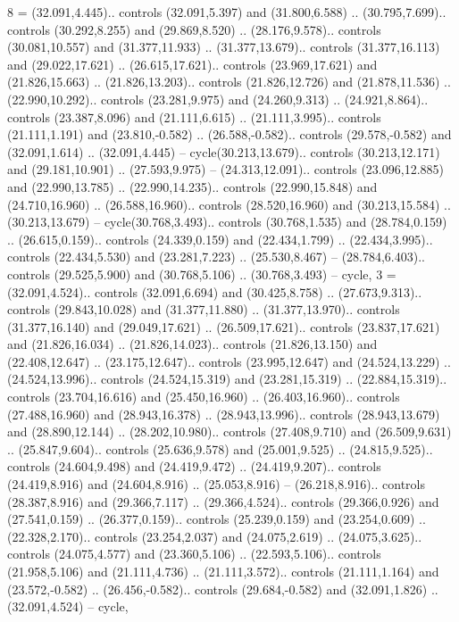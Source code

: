 {8} = {(32.091,4.445).. controls (32.091,5.397) and (31.800,6.588) .. (30.795,7.699).. controls (30.292,8.255) and (29.869,8.520) .. (28.176,9.578).. controls (30.081,10.557) and (31.377,11.933) .. (31.377,13.679).. controls (31.377,16.113) and (29.022,17.621) .. (26.615,17.621).. controls (23.969,17.621) and (21.826,15.663) .. (21.826,13.203).. controls (21.826,12.726) and (21.878,11.536) .. (22.990,10.292).. controls (23.281,9.975) and (24.260,9.313) .. (24.921,8.864).. controls (23.387,8.096) and (21.111,6.615) .. (21.111,3.995).. controls (21.111,1.191) and (23.810,-0.582) .. (26.588,-0.582).. controls (29.578,-0.582) and (32.091,1.614) .. (32.091,4.445) -- cycle(30.213,13.679).. controls (30.213,12.171) and (29.181,10.901) .. (27.593,9.975) -- (24.313,12.091).. controls (23.096,12.885) and (22.990,13.785) .. (22.990,14.235).. controls (22.990,15.848) and (24.710,16.960) .. (26.588,16.960).. controls (28.520,16.960) and (30.213,15.584) .. (30.213,13.679) -- cycle(30.768,3.493).. controls (30.768,1.535) and (28.784,0.159) .. (26.615,0.159).. controls (24.339,0.159) and (22.434,1.799) .. (22.434,3.995).. controls (22.434,5.530) and (23.281,7.223) .. (25.530,8.467) -- (28.784,6.403).. controls (29.525,5.900) and (30.768,5.106) .. (30.768,3.493) -- cycle},
{3} = {(32.091,4.524).. controls (32.091,6.694) and (30.425,8.758) .. (27.673,9.313).. controls (29.843,10.028) and (31.377,11.880) .. (31.377,13.970).. controls (31.377,16.140) and (29.049,17.621) .. (26.509,17.621).. controls (23.837,17.621) and (21.826,16.034) .. (21.826,14.023).. controls (21.826,13.150) and (22.408,12.647) .. (23.175,12.647).. controls (23.995,12.647) and (24.524,13.229) .. (24.524,13.996).. controls (24.524,15.319) and (23.281,15.319) .. (22.884,15.319).. controls (23.704,16.616) and (25.450,16.960) .. (26.403,16.960).. controls (27.488,16.960) and (28.943,16.378) .. (28.943,13.996).. controls (28.943,13.679) and (28.890,12.144) .. (28.202,10.980).. controls (27.408,9.710) and (26.509,9.631) .. (25.847,9.604).. controls (25.636,9.578) and (25.001,9.525) .. (24.815,9.525).. controls (24.604,9.498) and (24.419,9.472) .. (24.419,9.207).. controls (24.419,8.916) and (24.604,8.916) .. (25.053,8.916) -- (26.218,8.916).. controls (28.387,8.916) and (29.366,7.117) .. (29.366,4.524).. controls (29.366,0.926) and (27.541,0.159) .. (26.377,0.159).. controls (25.239,0.159) and (23.254,0.609) .. (22.328,2.170).. controls (23.254,2.037) and (24.075,2.619) .. (24.075,3.625).. controls (24.075,4.577) and (23.360,5.106) .. (22.593,5.106).. controls (21.958,5.106) and (21.111,4.736) .. (21.111,3.572).. controls (21.111,1.164) and (23.572,-0.582) .. (26.456,-0.582).. controls (29.684,-0.582) and (32.091,1.826) .. (32.091,4.524) -- cycle},
